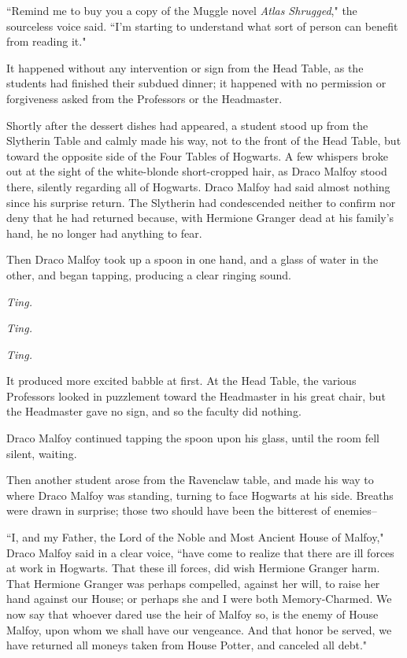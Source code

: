 ``Remind me to buy you a copy of the Muggle novel \emph{Atlas Shrugged}," the sourceless voice said. ``I'm starting to understand what sort of person can benefit from reading it."


It happened without any intervention or sign from the Head Table, as the students had finished their subdued dinner; it happened with no permission or forgiveness asked from the Professors or the Headmaster.

Shortly after the dessert dishes had appeared, a student stood up from the Slytherin Table and calmly made his way, not to the front of the Head Table, but toward the opposite side of the Four Tables of Hogwarts. A few whispers broke out at the sight of the white-blonde short-cropped hair, as Draco Malfoy stood there, silently regarding all of Hogwarts. Draco Malfoy had said almost nothing since his surprise return. The Slytherin had condescended neither to confirm nor deny that he had returned because, with Hermione Granger dead at his family's hand, he no longer had anything to fear.

Then Draco Malfoy took up a spoon in one hand, and a glass of water in the other, and began tapping, producing a clear ringing sound.

\emph{Ting.}

\emph{Ting.}

\emph{Ting.}

It produced more excited babble at first. At the Head Table, the various Professors looked in puzzlement toward the Headmaster in his great chair, but the Headmaster gave no sign, and so the faculty did nothing.

Draco Malfoy continued tapping the spoon upon his glass, until the room fell silent, waiting.

Then another student arose from the Ravenclaw table, and made his way to where Draco Malfoy was standing, turning to face Hogwarts at his side. Breaths were drawn in surprise; those two should have been the bitterest of enemies\---

``I, and my Father, the Lord of the Noble and Most Ancient House of Malfoy," Draco Malfoy said in a clear voice, ``have come to realize that there are ill forces at work in Hogwarts. That these ill forces, did wish Hermione Granger harm. That Hermione Granger was perhaps compelled, against her will, to raise her hand against our House; or perhaps she and I were both Memory-Charmed. We now say that whoever dared use the heir of Malfoy so, is the enemy of House Malfoy, upon whom we shall have our vengeance. And that honor be served, we have returned all moneys taken from House Potter, and canceled all debt."

